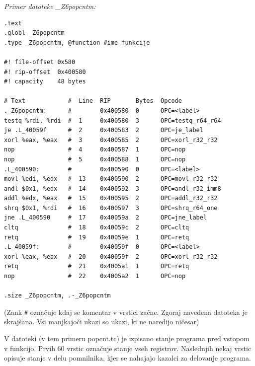 \documentclass[a4paper, 12pt]{book}
\begin{document}
\noindent
{\it Primer datoteke \_Z6popcntm:}
\begin{Verbatim}[baselinestretch=1]
.text
.globl _Z6popcntm
.type _Z6popcntm, @function #ime funkcije

#! file-offset 0x580
#! rip-offset  0x400580
#! capacity    48 bytes

# Text            #  Line  RIP       Bytes  Opcode             
._Z6popcntm:      #        0x400580  0      OPC=<label>        
testq %rdi, %rdi  #  1     0x400580  3      OPC=testq_r64_r64  
je .L_40059f      #  2     0x400583  2      OPC=je_label       
xorl %eax, %eax   #  3     0x400585  2      OPC=xorl_r32_r32   
nop               #  4     0x400587  1      OPC=nop            
nop               #  5     0x400588  1      OPC=nop                       
.L_400590:        #        0x400590  0      OPC=<label>        
movl %edi, %edx   #  13    0x400590  2      OPC=movl_r32_r32   
andl $0x1, %edx   #  14    0x400592  3      OPC=andl_r32_imm8  
addl %edx, %eax   #  15    0x400595  2      OPC=addl_r32_r32   
shrq $0x1, %rdi   #  16    0x400597  3      OPC=shrq_r64_one   
jne .L_400590     #  17    0x40059a  2      OPC=jne_label      
cltq              #  18    0x40059c  2      OPC=cltq           
retq              #  19    0x40059e  1      OPC=retq           
.L_40059f:        #        0x40059f  0      OPC=<label>        
xorl %eax, %eax   #  20    0x40059f  2      OPC=xorl_r32_r32   
retq              #  21    0x4005a1  1      OPC=retq           
nop               #  22    0x4005a2  1      OPC=nop                      

.size _Z6popcntm, .-_Z6popcntm
\end{Verbatim}
\noindent
{\small (Zank \texttt{\#} označuje kdaj se komentar v vrstici začne. Zgoraj navedena datoteka je skrajšana. Vsi manjkajoči ukazi so ukazi, ki ne naredijo ničesar)}

V datoteki (v tem primeru popcnt.tc) je izpisano stanje programa pred vstopom v funkcijo. Prvih 60 vrstic označuje stanje vseh registrov. Naslednjih nekaj vrstic opisuje stanje v delu pomnilnika, kjer se nahajajo kazalci za delovanje programa.

 \medskip
 
\end{document}
